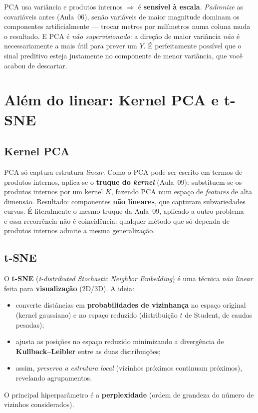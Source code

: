 \documentclass[11pt,a4paper]{article}
\begin{document}
\begin{atencao}
PCA usa variância e produtos internos $\Rightarrow$ é \textbf{sensível à escala}.
\emph{Padronize} as covariáveis antes (Aula~06), senão variáveis de maior magnitude
dominam os componentes artificialmente --- trocar metros por milímetros numa coluna
muda o resultado. E PCA é \emph{não supervisionado}: a direção de maior variância
\emph{não} é necessariamente a mais útil para prever um $Y$. É perfeitamente
possível que o sinal preditivo esteja justamente no componente de menor variância,
que você acabou de descartar.
\end{atencao}

\section{Além do linear: Kernel PCA e t-SNE}
\subsection{Kernel PCA}
PCA só captura estrutura \emph{linear}. Como o PCA pode ser escrito em termos de
produtos internos, aplica-se o \textbf{truque do \emph{kernel}} (Aula~09):
substituem-se os produtos internos por um kernel $K$, fazendo PCA num espaço de
\emph{features} de alta dimensão. Resultado: componentes \textbf{não lineares}, que
capturam subvariedades curvas. É literalmente o mesmo truque da Aula~09, aplicado a
outro problema --- e essa recorrência não é coincidência: qualquer método que só
dependa de produtos internos admite a mesma generalização.

\subsection{t-SNE}
O \textbf{t-SNE} (\emph{t-distributed Stochastic Neighbor Embedding}) é uma técnica
\emph{não linear} feita para \textbf{visualização} (2D/3D). A ideia:
\begin{itemize}[leftmargin=1.4cm,nosep]
  \item converte distâncias em \textbf{probabilidades de vizinhança} no espaço
        original (kernel gaussiano) e no espaço reduzido (distribuição $t$ de
        Student, de caudas pesadas);
  \item ajusta as posições no espaço reduzido minimizando a divergência de
        \textbf{Kullback--Leibler} entre as duas distribuições;
  \item assim, \emph{preserva a estrutura local} (vizinhos próximos continuam
        próximos), revelando agrupamentos.
\end{itemize}
O principal hiperparâmetro é a \textbf{perplexidade} (ordem de grandeza do número de
vizinhos considerados).
\end{document}
